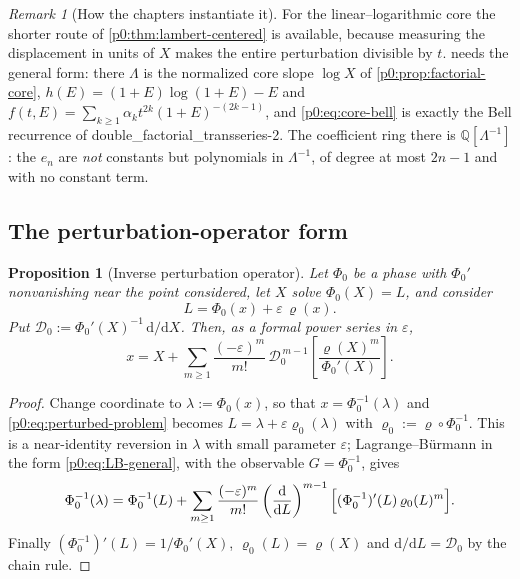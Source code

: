 \documentclass[11pt,a4paper,oneside]{book}
\theoremstyle{plain}
\newtheorem{proposition}[theorem]{Proposition}
\theoremstyle{definition}
\theoremstyle{remark}
\newtheorem{remark}[theorem]{Remark}
\newcommand{\Rat}{\mathbb{Q}}
\newcommand{\dd}{\mathrm{d}}
\begin{document}
\begin{remark}[How the chapters instantiate it]\label{p0:rem:core-instances}
For the linear--logarithmic core the shorter route of
\cref{p0:thm:lambert-centered} is available, because measuring the displacement
in units of $X$ makes the entire perturbation divisible by $t$.
 needs the general form: there $\Lambda$ is the normalized
core slope $\log X$ of \cref{p0:prop:factorial-core},
$h(E)=(1+E)\log(1+E)-E$ and
$f(t,E)=\sum_{k\ge1}\alpha_kt^{2k}(1+E)^{-(2k-1)}$, and
\eqref{p0:eq:core-bell} is exactly the Bell recurrence of
\textsf{double\_factorial\_transseries-2}.  The coefficient ring there is
$\Rat[\Lambda^{-1}]$: the $e_n$ are \emph{not} constants but polynomials in
$\Lambda^{-1}$, of degree at most $2n-1$ and with no constant term.
\end{remark}

\subsection{The perturbation-operator form}

\begin{proposition}[Inverse perturbation operator]\label{p0:prop:operator-form}
Let $\Phi_0$ be a phase with $\Phi_0'$ nonvanishing near the point considered,
let $X$ solve $\Phi_0(X)=L$, and consider
\begin{equation}\label{p0:eq:perturbed-problem}
 L=\Phi_0(x)+\varepsilon\,\varrho(x).
\end{equation}
Put $\mathscr D_0:=\Phi_0'(X)^{-1}\,\dd/\dd X$.  Then, as a formal power series
in $\varepsilon$,
\begin{equation}\label{p0:eq:operator-series}
 x=X+\sum_{m\ge1}\frac{(-\varepsilon)^m}{m!}\,
   \mathscr D_0^{\,m-1}\!\left[\frac{\varrho(X)^m}{\Phi_0'(X)}\right].
\end{equation}
\end{proposition}

\begin{proof}
Change coordinate to $\lambda:=\Phi_0(x)$, so that $x=\Phi_0^{-1}(\lambda)$ and
\eqref{p0:eq:perturbed-problem} becomes
$L=\lambda+\varepsilon\varrho_0(\lambda)$ with
$\varrho_0:=\varrho\circ\Phi_0^{-1}$.  This is a near-identity reversion in
$\lambda$ with small parameter $\varepsilon$; Lagrange--B\"urmann in the form
\eqref{p0:eq:LB-general}, with the observable $G=\Phi_0^{-1}$, gives
\[
 \Phi_0^{-1}(\lambda)
 =\Phi_0^{-1}(L)+\sum_{m\ge1}\frac{(-\varepsilon)^m}{m!}
  \left(\frac{\dd}{\dd L}\right)^{m-1}
  \Bigl[(\Phi_0^{-1})'(L)\,\varrho_0(L)^m\Bigr].
\]
Finally $(\Phi_0^{-1})'(L)=1/\Phi_0'(X)$, $\varrho_0(L)=\varrho(X)$ and
$\dd/\dd L=\mathscr D_0$ by the chain rule.
\end{proof}
\end{document}
